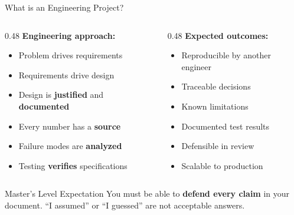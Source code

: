 \documentclass[aspectratio=169,11pt]{beamer}
\begin{document}
\begin{frame}{What is an Engineering Project?}
    \begin{columns}[T]
        \begin{column}{0.48\textwidth}
            \textbf{Engineering approach:}
            \begin{itemize}
                \item Problem drives requirements
                \item Requirements drive design
                \item Design is \textbf{justified} and \textbf{documented}
                \item Every number has a \textbf{source}
                \item Failure modes are \textbf{analyzed}
                \item Testing \textbf{verifies} specifications
            \end{itemize}
        \end{column}
        \begin{column}{0.48\textwidth}
            \textbf{Expected outcomes:}
            \begin{itemize}
                \item Reproducible by another engineer
                \item Traceable decisions
                \item Known limitations
                \item Documented test results
                \item Defensible in review
                \item Scalable to production
            \end{itemize}
        \end{column}
    \end{columns}
    
    \vspace{0.3cm}
    \begin{alertblock}{Master's Level Expectation}
        You must be able to \textbf{defend every claim} in your document. ``I assumed'' or ``I guessed'' are not acceptable answers.
    \end{alertblock}
\end{frame}
\end{document}

